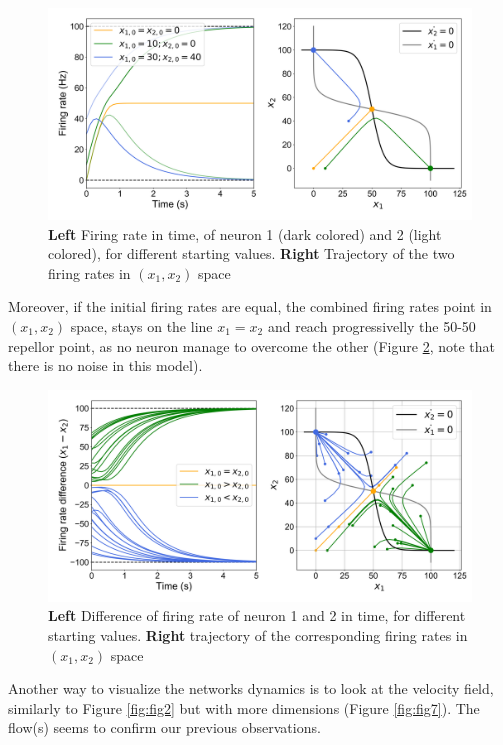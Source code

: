 \documentclass{article}
\begin{document}
\begin{figure}[H]
\centering
\includegraphics[width=1\linewidth]{exercice5fig5.png}
\caption[spt]{\textbf{Left} Firing rate in time, of neuron 1 (dark colored) and 2 (light colored), for different starting values. \textbf{Right} Trajectory of the two firing rates in $(x_1, x_2)$ space}\label{fig:fig5}
\end{figure}

Moreover, if the initial firing rates are equal, the combined firing rates point in $(x_1, x_2)$ space, stays on the line $x_1 = x_2$ and reach progressivelly the 50-50 repellor point, as no neuron manage to overcome the other (Figure \ref{fig:fig6}, note that there is no noise in this model).

\begin{figure}[H]
\centering
\includegraphics[width=1\linewidth]{exercice5fig6.png}
\caption[spt]{\textbf{Left} Difference of firing rate  of neuron 1 and 2 in time, for different starting values. \textbf{Right} trajectory of the corresponding firing rates in $(x_1, x_2)$ space}\label{fig:fig6}
\end{figure}

Another way to visualize the networks dynamics is to look at the velocity field, similarly to Figure \ref{fig:fig2} but with more dimensions (Figure \ref{fig:fig7}). The flow(s) seems to confirm our previous observations.
\end{document}
